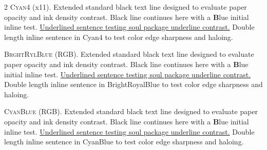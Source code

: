 \begin{multicols}{2}
\lettrine[lines=2]{\textcolor{Cyan4}{C}}{yan4} (x11). Extended standard black text line designed to evaluate paper opacity and ink density contrast. Black line continues here with a \textbf{\textcolor{Cyan4}{B}}lue initial inline test. \ul{Underlined sentence testing soul package underline contrast.} \textcolor{Cyan4}{Double length inline sentence in Cyan4 to test color edge sharpness and haloing.}


\lettrine[lines=2]{\textcolor{BrightRoyalBlue}{B}}{rghtRylBlue} (RGB). Extended standard black text line designed to evaluate paper opacity and ink density contrast. Black line continues here with a \textbf{\textcolor{BrightRoyalBlue}{B}}lue initial inline test. \ul{Underlined sentence testing soul package underline contrast.} \textcolor{BrightRoyalBlue}{Double length inline sentence in BrightRoyalBlue to test color edge sharpness and haloing.}


\lettrine[lines=2]{\textcolor{CyanBlue}{C}}{yanBlue} (RGB). Extended standard black text line designed to evaluate paper opacity and ink density contrast. Black line continues here with a \textbf{\textcolor{CyanBlue}{B}}lue initial inline test. \ul{Underlined sentence testing soul package underline contrast.} \textcolor{CyanBlue}{Double length inline sentence in CyanBlue to test color edge sharpness and haloing.}








\end{multicols}

